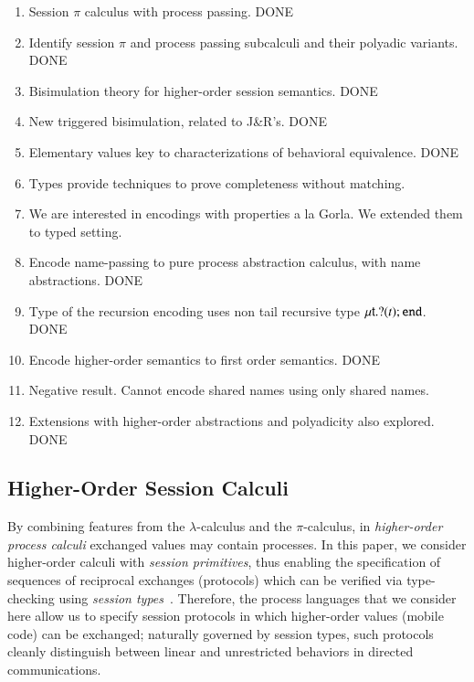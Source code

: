 \begin{enumerate}[1.]
	\item	Session $\pi$ calculus with process passing. DONE
	\item	Identify session $\pi$ and process passing subcalculi and their polyadic variants. DONE
	\item	Bisimulation theory for higher-order session semantics. DONE
	\item	New triggered bisimulation, related to J\&R's. DONE
	\item   Elementary values key to characterizations of behavioral equivalence. DONE
	\item	Types provide techniques to prove completeness without matching. 
	\item	We are interested in encodings with properties a la Gorla. 
                We extended them to typed setting. 
	\item	Encode name-passing to pure process abstraction calculus, with name abstractions. DONE
	\item	Type of the recursion encoding uses non tail recursive type $\mu\mathsf{t}.? (t) ; \mathtt{end}$. DONE
	\item	Encode higher-order semantics to first order semantics. DONE
	\item	Negative result. Cannot encode shared names using only shared names.
	\item   Extensions with higher-order abstractions and polyadicity also explored. DONE
\end{enumerate}

%

%

\subsection{Higher-Order Session Calculi}
\noi 
By combining features from the $\lambda$-calculus and the $\pi$-calculus, 
in \emph{higher-order process calculi} exchanged values may contain  processes. 
In this paper, we consider higher-order calculi with \emph{session primitives},
thus enabling the specification of sequences of reciprocal exchanges (protocols)
which can be verified via type-checking using \emph{session types}~\cite{honda.vasconcelos.kubo:language-primitives}.
Therefore, the process languages that we consider here allow us to specify   
session protocols in which higher-order values 
(mobile code) can be exchanged; naturally governed by session types, 
such protocols cleanly distinguish between 
linear and unrestricted behaviors in 
directed %
communications.

